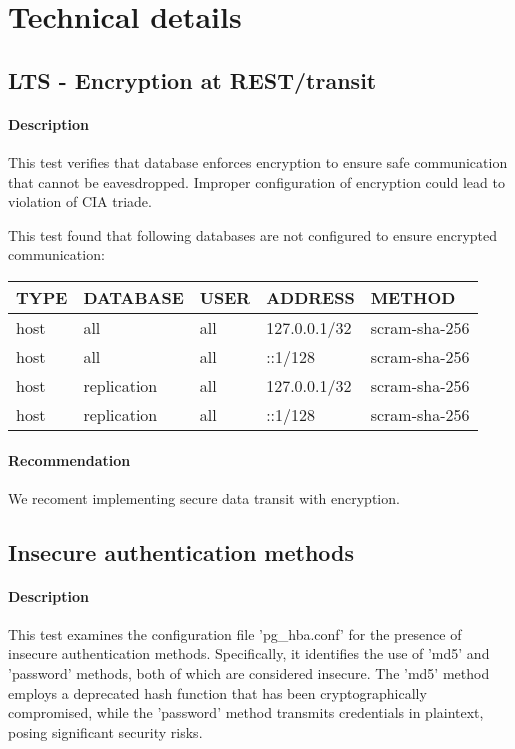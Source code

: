 \section{Technical details}
\subsection{LTS - Encryption at REST/transit}
\paragraph{Description} This test verifies that database enforces encryption to ensure safe communication that cannot be eavesdropped. Improper configuration of encryption could lead to violation of CIA triade.

This test found that following databases are not configured to ensure encrypted communication:
\begin{center}
\begin{tabular}{|l|l|l|l|l|}
\hline
\textbf{TYPE} & \textbf{DATABASE} & \textbf{USER} & \textbf{ADDRESS} & \textbf{METHOD} \\ \hline
host & all & all & 127.0.0.1/32 & scram-sha-256 \\ \hline
host & all & all & ::1/128 & scram-sha-256 \\ \hline
host & replication & all & 127.0.0.1/32 & scram-sha-256 \\ \hline
host & replication & all & ::1/128 & scram-sha-256 \\ \hline
\end{tabular}
\end{center}
\paragraph{Recommendation} We recoment implementing secure data transit with encryption.

\subsection{Insecure authentication methods}
\paragraph{Description} This test examines the configuration file 'pg\_hba.conf' for the presence of insecure authentication methods. Specifically, it identifies the use of 'md5' and 'password' methods, both of which are considered insecure. The 'md5' method employs a deprecated hash function that has been cryptographically compromised, while the 'password' method transmits credentials in plaintext, posing significant security risks.

